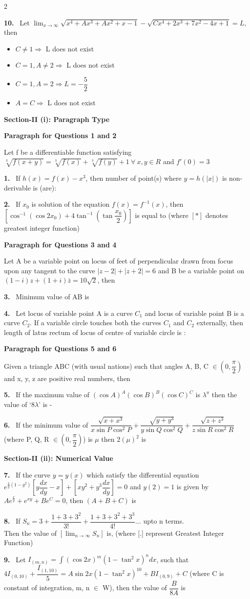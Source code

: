 \documentclass[10pt]{extarticle}
\newcommand{\sect}[1]{\par\smallskip\noindent\textbf{#1}\par}
\newcommand{\qn}[1]{\par\smallskip\noindent\textbf{#1.}~}
\newcommand{\paraq}[2]{\par\smallskip\noindent\textbf{Paragraph for Questions #1 and #2}\par}
\newenvironment{qoptions}{\begin{itemize}[leftmargin=1.8em,itemsep=1pt,topsep=2pt,label={}]}{\end{itemize}}
\newcommand{\opt}[2]{\item[(#1)] #2}
\begin{document}
\begin{multicols}{2}
\qn{10} Let $\displaystyle\lim_{x\to\infty}\sqrt{x^4+Ax^3+Ax^2+x-1}-\sqrt{Cx^4+2x^3+7x^2-4x+1}=L$, then
\begin{qoptions}
\opt{A}{$C\ne1\Rightarrow$ L does not exist}
\opt{B}{$C=1,A\ne2\Rightarrow$ L does not exist}
\opt{C}{$C=1,A=2\Rightarrow L=-\dfrac52$}
\opt{D}{$A=C\Rightarrow$ L does not exist}
\end{qoptions}

\sect{Section-II (i): Paragraph Type}

\paraq{1}{2}
Let f be a differentiable function satisfying\\
$\sqrt[3]{f(x+y)}=\sqrt[3]{f(x)}+\sqrt[3]{f(y)}+1\ \forall\ x,y\in R$ and $f'(0)=3$

\qn{1} If $h(x)=f(x)-x^3$, then number of point(s) where $y=h(|x|)$ is non-derivable is (are):

\qn{2} If $x_0$ is solution of the equation $f(x)=f^{-1}(x)$, then $\left[\cos^{-1}(\cos2x_0)+4\tan^{-1}\left(\tan\dfrac{x_0}{2}\right)\right]$ is equal to (where $[*]$ denotes greatest integer function)

\paraq{3}{4}
Let A be a variable point on locus of feet of perpendicular drawn from focus upon any tangent to the curve $|z-2|+|z+2|=6$ and B be a variable point on $(1-i)z+(1+i)\bar z=10\sqrt2$, then

\qn{3} Minimum value of AB is

\qn{4} Let locus of variable point A is a curve $C_1$ and locus of variable point B is a curve $C_2$. If a variable circle touches both the curves $C_1$ and $C_2$ externally, then length of latus rectum of locus of centre of variable circle is :

\paraq{5}{6}
Given a triangle ABC (with usual nations) such that angles A, B, C $\in\left(0,\dfrac\pi2\right)$ and x, y, z are positive real numbers, then

\qn{5} If the maximum value of $(\cos A)^A(\cos B)^B(\cos C)^C$ is $\lambda^\pi$ then the value of `$8\lambda$' is -

\qn{6} If the minimum value of $\dfrac{\sqrt{x+x^3}}{x\sin P\cos^2P}+\dfrac{\sqrt{y+y^3}}{y\sin Q\cos^2Q}+\dfrac{\sqrt{z+z^3}}{z\sin R\cos^2R}$ (where P, Q, R $\in\left(0,\dfrac\pi2\right)$) is $\mu$ then $2(\mu)^2$ is

\sect{Section-II (ii): Numerical Value}

\qn{7} If the curve $y=y(x)$ which satisfy the differential equation $e^{\frac xy(1-y^2)}\left[y\dfrac{dx}{dy}-x\right]+\left[xy^2+y^3\dfrac{dx}{dy}\right]=0$ and $y(2)=1$ is given by $Ae^{\frac xy}+e^{xy}+Be^C=0$, then $(A+B+C)$ is

\qn{8} If $S_n=3+\dfrac{1+3+3^2}{3!}+\dfrac{1+3+3^2+3^3}{4!}\ldots$ upto n terms.\\
Then the value of $\left[\displaystyle\lim_{n\to\infty}S_n\right]$ is, (where [.] represent Greatest Integer Function)

\qn{9} Let $I_{(m,n)}=\displaystyle\int(\cos2x)^m(1-\tan^2x)^ndx$, such that\\
$4I_{(0,10)}+\dfrac{I_{(1,10)}}{5}=A\sin2x(1-\tan^2x)^{10}+BI_{(0,9)}+C$ (where C is constant of integration, m, n $\in$ W), then the value of $\dfrac{B}{8A}$ is

\end{multicols}
\end{document}
